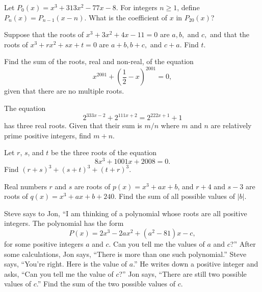 \documentclass[12pt,a4paper]{memoir}
\theoremstyle{definition}
\begin{document}
\begin{question}[name={1993 AIME}]
	Let $P_0(x) = x^3 + 313x^2 - 77x - 8$. For integers $n \ge 1$, define $P_n(x) = P_{n - 1}(x - n)$. What is the coefficient of $x$ in $P_{20}(x)$?
\end{question}



\begin{question}[name={1996 AIME}]
	Suppose that the roots of $x^3+3x^2+4x-11=0$ are $a, b,$ and $c,$ and that the roots of $x^3+rx^2+sx+t=0$ are $a+b, b+c,$ and $c+a.$ Find $t$.
\end{question}


\begin{question}[name={2001 AIME}]
	Find the sum of the roots, real and non-real, of the equation \[x^{2001}+\left(\frac 12-x\right)^{2001}=0,\] given that there are no multiple roots.	
\end{question}

\begin{question}[name={2005 AIME}]
	The equation\[2^{333x-2}+2^{111x+2}=2^{222x+1}+1\]has three real roots. Given that their sum is $m/n$ where $m$ and $n$ are relatively prime positive integers, find $m+n$.
\end{question}

\begin{question}[name={2008 AIME}]
	Let $ r$, $ s$, and $ t$ be the three roots of the equation
	\[ 8x^3+1001x+2008=0.\]Find $ (r+s)^3+(s+t)^3+(t+r)^3$.
\end{question}


\begin{question}[name={2014 AIME}]
	Real numbers $r$ and $s$ are roots of $p(x)=x^3+ax+b$, and $r+4$ and $s-3$ are roots of $q(x)=x^3+ax+b+240$. Find the sum of all possible values of $|b|$.	
\end{question}

\begin{question}[name={2015 AIME}]
	Steve says to Jon, ``I am thinking of a polynomial whose roots are all positive integers. The polynomial has the form \[P(x)=2x^3-2ax^2+(a^2-81)x-c,\] for some positive integers $a$ and $c$. Can you tell me the values of $a$ and $c$?'' After some calculations, Jon says, ``There is more than one such polynomial.'' Steve says, ``You're right. Here is the value of $a$.'' He writes down a positive integer and asks, ``Can you tell me the value of $c$?'' Jon says, ``There are still two possible values of $c$.'' Find the sum of the two possible values of $c$.
\end{question}
\end{document}
